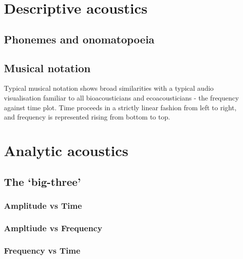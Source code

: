 \documentclass[
]{book}
\begin{document}
\hypertarget{descriptive-acoustics}{%
\section{Descriptive acoustics}\label{descriptive-acoustics}}

\hypertarget{phonemes-and-onomatopoeia}{%
\subsection{Phonemes and onomatopoeia}\label{phonemes-and-onomatopoeia}}

\hypertarget{musical-notation}{%
\subsection{Musical notation}\label{musical-notation}}

Typical musical notation shows broad similarities with a typical audio visualisation familiar to all bioacousticians and ecoacousticians - the frequency against time plot. Time proceeds in a strictly linear fashion from left to right, and frequency is represented rising from bottom to top.

\hypertarget{analytic-acoustics}{%
\section{Analytic acoustics}\label{analytic-acoustics}}

\hypertarget{the-big-three}{%
\subsection{The `big-three'}\label{the-big-three}}

\hypertarget{amplitude-vs-time}{%
\subsubsection{Amplitude vs Time}\label{amplitude-vs-time}}

\hypertarget{ampltiude-vs-frequency}{%
\subsubsection{Ampltiude vs Frequency}\label{ampltiude-vs-frequency}}

\hypertarget{frequency-vs-time}{%
\subsubsection{Frequency vs Time}\label{frequency-vs-time}}
\end{document}

